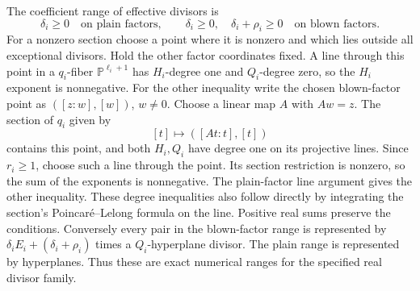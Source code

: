 \documentclass[11pt]{article}
\newcommand{\PP}{\mathbb P}
\begin{document}
The coefficient range of effective divisors is
\begin{equation}\label{eq:effective-range}
 \delta_i\geq0\quad\text{on plain factors},\qquad
 \delta_i\geq0,\quad\delta_i+\rho_i\geq0
                                      \quad\text{on blown factors}.
\end{equation}
For a nonzero section choose a point where it is nonzero and which
lies outside all exceptional divisors. Hold the other factor
coordinates fixed. A line through this point in a $q_i$-fiber
$\PP^{\ell_i+1}$ has $H_i$-degree one and $Q_i$-degree zero,
so the $H_i$ exponent is nonnegative. For the other inequality write
the chosen blown-factor point as $([z:w],[w])$, $w\ne0$. Choose
a linear map $A$ with $Aw=z$. The section of $q_i$ given by
\[
 [t]\longmapsto([At:t],[t])
\]
contains this point, and both $H_i,Q_i$ have degree one on its
projective lines. Since $r_i\geq1$, choose such a line through
the point. Its section restriction is nonzero, so the sum of the
exponents is nonnegative. The plain-factor line argument gives
the other inequality. These degree inequalities also follow directly
by integrating the section's Poincar\'e--Lelong formula on the line.
Positive real sums preserve the conditions. Conversely every pair
in the blown-factor range
is represented by
$\delta_iE_i+(\delta_i+\rho_i)$ times a $Q_i$-hyperplane divisor.
The plain range is represented by hyperplanes. Thus these are exact
numerical ranges for the specified real divisor family.
\end{document}
